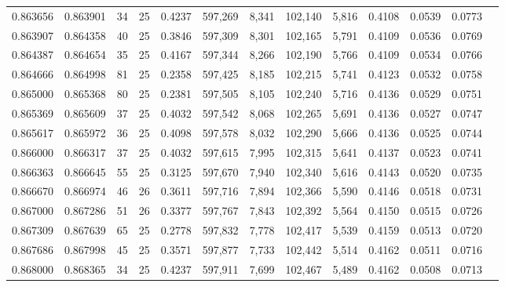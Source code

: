 \begin{tabular}{rrrrrrrrrrrrr}
0.863656 & 0.863901 &    34 &  25 &                                     0.4237 & 597,269 &   8,341 & 102,140 &   5,816 & 0.4108 & 0.0539 & 0.0773 \\
0.863907 & 0.864358 &    40 &  25 &                                     0.3846 & 597,309 &   8,301 & 102,165 &   5,791 & 0.4109 & 0.0536 & 0.0769 \\
0.864387 & 0.864654 &    35 &  25 &                                     0.4167 & 597,344 &   8,266 & 102,190 &   5,766 & 0.4109 & 0.0534 & 0.0766 \\
0.864666 & 0.864998 &    81 &  25 &                                     0.2358 & 597,425 &   8,185 & 102,215 &   5,741 & 0.4123 & 0.0532 & 0.0758 \\
0.865000 & 0.865368 &    80 &  25 &                                     0.2381 & 597,505 &   8,105 & 102,240 &   5,716 & 0.4136 & 0.0529 & 0.0751 \\
0.865369 & 0.865609 &    37 &  25 &                                     0.4032 & 597,542 &   8,068 & 102,265 &   5,691 & 0.4136 & 0.0527 & 0.0747 \\
0.865617 & 0.865972 &    36 &  25 &                                     0.4098 & 597,578 &   8,032 & 102,290 &   5,666 & 0.4136 & 0.0525 & 0.0744 \\
0.866000 & 0.866317 &    37 &  25 &                                     0.4032 & 597,615 &   7,995 & 102,315 &   5,641 & 0.4137 & 0.0523 & 0.0741 \\
0.866363 & 0.866645 &    55 &  25 &                                     0.3125 & 597,670 &   7,940 & 102,340 &   5,616 & 0.4143 & 0.0520 & 0.0735 \\
0.866670 & 0.866974 &    46 &  26 &                                     0.3611 & 597,716 &   7,894 & 102,366 &   5,590 & 0.4146 & 0.0518 & 0.0731 \\
0.867000 & 0.867286 &    51 &  26 &                                     0.3377 & 597,767 &   7,843 & 102,392 &   5,564 & 0.4150 & 0.0515 & 0.0726 \\
0.867309 & 0.867639 &    65 &  25 &                                     0.2778 & 597,832 &   7,778 & 102,417 &   5,539 & 0.4159 & 0.0513 & 0.0720 \\
0.867686 & 0.867998 &    45 &  25 &                                     0.3571 & 597,877 &   7,733 & 102,442 &   5,514 & 0.4162 & 0.0511 & 0.0716 \\
0.868000 & 0.868365 &    34 &  25 &                                     0.4237 & 597,911 &   7,699 & 102,467 &   5,489 & 0.4162 & 0.0508 & 0.0713 \\

\end{tabular}
